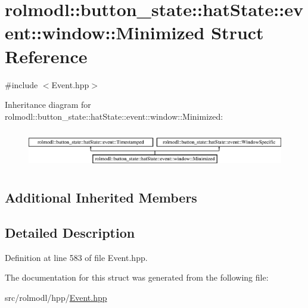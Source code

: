 \hypertarget{structrolmodl_1_1button__state_1_1hat_state_1_1event_1_1window_1_1_minimized}{}\section{rolmodl\+::button\+\_\+state\+::hat\+State\+::event\+::window\+::Minimized Struct Reference}
\label{structrolmodl_1_1button__state_1_1hat_state_1_1event_1_1window_1_1_minimized}


{\ttfamily \#include $<$Event.\+hpp$>$}

Inheritance diagram for rolmodl\+::button\+\_\+state\+::hat\+State\+::event\+::window\+::Minimized\+:\begin{figure}[H]
\begin{center}
\leavevmode
\includegraphics[height=1.686747cm]{structrolmodl_1_1button__state_1_1hat_state_1_1event_1_1window_1_1_minimized}
\end{center}
\end{figure}
\subsection*{Additional Inherited Members}


\subsection{Detailed Description}


Definition at line 583 of file Event.\+hpp.



The documentation for this struct was generated from the following file\+:\begin{DoxyCompactItemize}
\item 
src/rolmodl/hpp/\mbox{\hyperlink{_event_8hpp}{Event.\+hpp}}\end{DoxyCompactItemize}

